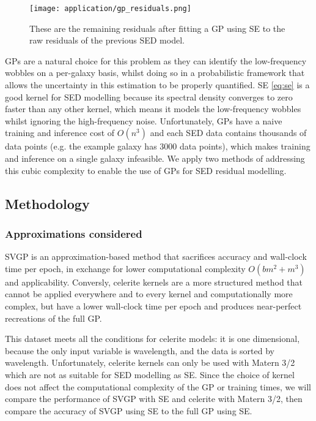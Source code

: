 \begin{figure}[H]
    \texttt{[image: application/gp\_residuals.png]}
    \caption{These are the remaining residuals after fitting a GP using SE \cite{galaxy-gp-noise} to the raw residuals of the previous SED model.}
\end{figure}
GPs are a natural choice for this problem as they can identify the low-frequency wobbles on a per-galaxy basis, whilst doing so in a probabilistic framework that allows the uncertainty in this estimation to be properly quantified. SE \ref{eq:se} is a good kernel for SED modelling because its spectral density converges to zero faster than any other kernel, which means it models the low-frequency wobbles whilst ignoring the high-frequency noise. Unfortunately, GPs have a naive training and inference cost of $O(n^3)$ and each SED data contains thousands of data points (e.g. the example galaxy has 3000 data points), which makes training and inference on a single galaxy infeasible. We apply two methods of addressing this cubic complexity to enable the use of GPs for SED residual modelling.

\subsection{Methodology}

\subsubsection{Approximations considered}
SVGP is an approximation-based method that sacrifices accuracy and wall-clock time per epoch, in exchange for lower computational complexity $O(bm^2 + m^3)$ and applicability. Conversly, celerite kernels are a more structured method that cannot be applied everywhere and to every kernel and computationally more complex, but have a lower wall-clock time per epoch and produces near-perfect recreations of the full GP.

This dataset meets all the conditions for celerite models: it is one dimensional, because the only input variable is wavelength, and the data is sorted by wavelength. Unfortunately, celerite kernels can only be used with Matern 3/2 which are not as suitable for SED modelling as SE. Since the choice of kernel does not affect the computational complexity of the GP or training times, we will compare the performance of SVGP with SE and celerite with Matern 3/2, then compare the accuracy of SVGP using SE to the full GP using SE.

